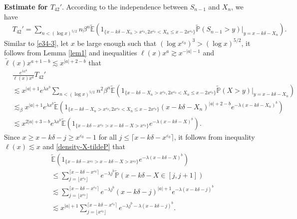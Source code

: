 \documentclass[11pt]{article}
\numberwithin{equation}{section}
\begin{document}
\noindent
{\bf Estimate for $T_{42}'$}.  According to the independence between $S_{n-1}$ and $X_n$, we have 
\begin{align}
	&T_{42}' = \sum_{n< (\log x)^{5/2}}  n\beta^{n}\widetilde{\mathbb{E}}\left(1_{\{x-k\delta-X_n>x^{\varepsilon_0},   2x^{\varepsilon_0}< X_n \leq x-2x^{\varepsilon_0} \}}  \widetilde{\mathbb{P}}(S_{n-1}>y)|_{y= x-k\delta-X_n}    \right) . 
\end{align}
Similar to \eqref{e34-3}, let $x$ be large enough such that $ (\log x^{\varepsilon_0})^3> (\log x)^{5/2}$,  it follows from Lemma \ref{lem1} and inequalities $\ell(x)x^a \gtrsim x^{-|a|-1}$ and  $\widetilde{\ell}(x)x^{a+1-b}\lesssim x^{|a|+2-b}$ that 
\begin{align}\label{e28-1}
	& \frac{e^{\lambda x^b} }{\ell(x)x^a } T_{42}'\nonumber\\
	&\lesssim  x^{|a|+1} e^{\lambda x^b}\sum_{n< (\log x)^{5/2}}  n^2\beta^{n}\widetilde{\mathbb{E}}\left(1_{\{x-k\delta-X_n>x^{\varepsilon_0},   2x^{\varepsilon_0}< X_n \leq x-2x^{\varepsilon_0} \}}  \widetilde{\mathbb{P}}(X>y)|_{y= x-k\delta-X_n}    \right) \nonumber\\
	&\lesssim_\beta  x^{|a|+1} e^{\lambda x^b}\widetilde{\mathbb{E}}\left(1_{\{x-k\delta-X_n>x^{\varepsilon_0},   2x^{\varepsilon_0}< X_n \leq x-2x^{\varepsilon_0} \}}  ( x-k\delta-X_n)^{|a|+2-b} e^{-\lambda ( x-k\delta-X_n)^b}   \right) \nonumber\\
	&\lesssim x^{2|a|+3-b} e^{\lambda x^b}\widetilde{\mathbb{E}}\left(1_{\{x-k\delta- x^{\varepsilon_0} >x-k\delta-X>x^{\varepsilon_0}    \}}   e^{-\lambda ( x-k\delta-X)^b}   \right).
\end{align}
Since $x\geq x-k\delta-j \geq x^{\varepsilon_0}-1$ for all $j\leq \lceil x-k\delta -x^{\varepsilon_0}\rceil$,  it follows from inequality $\ell(x)\lesssim x$ and \eqref{density-X-tildeP} that 
\begin{align}
	& \widetilde{\mathbb{E}}\left( 1_{\{x-k\delta- x^{\varepsilon_0} >x-k\delta-X>x^{\varepsilon_0}    \}}    e^{-\lambda (x-k\delta-X)^b}\right) \nonumber\\
	& \leq   \sum_{j= \lfloor x^{\varepsilon_0}\rfloor}^{\lceil x-k\delta -x^{\varepsilon_0}\rceil}  e^{-\lambda j^b} \widetilde{\mathbb{P}}(x-k\delta-X \in [j, j+1]) \nonumber\\
	& \lesssim \sum_{j= \lfloor x^{\varepsilon_0}\rfloor}^{\lceil x-k\delta -x^{\varepsilon_0}\rceil}  e^{-\lambda j^b} (x-k\delta-j)^{|a|+1}e^{-\lambda (x-k\delta -j)^b} \nonumber\\
	&\lesssim  x^{|a|+1}\sum_{j= \lfloor x^{\varepsilon_0}\rfloor}^{\lceil x-k\delta -x^{\varepsilon_0}\rceil}  e^{-\lambda j^b -\lambda (x-k\delta -j)^b} .
\end{align}
\end{document}
